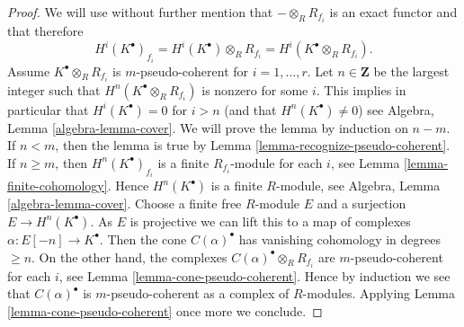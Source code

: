 \documentclass[10pt,a4paper]{amsart}
\theoremstyle{plain}
\theoremstyle{definition}
\theoremstyle{remark}
\numberwithin{equation}{subsection}
\begin{document}
\begin{proof}
We will use without further mention that $- \otimes_R R_{f_i}$ is
an exact functor and that therefore
$$
H^i(K^\bullet)_{f_i} =
H^i(K^\bullet) \otimes_R R_{f_i} = H^i(K^\bullet \otimes_R R_{f_i}).
$$
Assume $K^\bullet \otimes_R R_{f_i}$ is $m$-pseudo-coherent
for $i = 1, \ldots, r$. Let $n \in \mathbf{Z}$ be the largest
integer such that $H^n(K^\bullet \otimes_R R_{f_i})$ is nonzero
for some $i$. This implies in particular that $H^i(K^\bullet) = 0$
for $i > n$ (and that $H^n(K^\bullet) \not = 0$) see
Algebra, Lemma \ref{algebra-lemma-cover}.
We will prove the lemma by induction on $n - m$.
If $n < m$, then the lemma is true by
Lemma \ref{lemma-recognize-pseudo-coherent}.
If $n \geq m$, then $H^n(K^\bullet)_{f_i}$ is a finite $R_{f_i}$-module
for each $i$, see
Lemma \ref{lemma-finite-cohomology}.
Hence $H^n(K^\bullet)$ is a finite $R$-module, see
Algebra, Lemma \ref{algebra-lemma-cover}.
Choose a finite free $R$-module $E$ and a surjection $E \to H^n(K^\bullet)$.
As $E$ is projective we can lift this to a map of complexes
$\alpha : E[-n] \to K^\bullet$. Then the cone $C(\alpha)^\bullet$ has
vanishing cohomology in degrees $\geq n$. On the other hand, the
complexes $C(\alpha)^\bullet \otimes_R R_{f_i}$ are $m$-pseudo-coherent
for each $i$, see
Lemma \ref{lemma-cone-pseudo-coherent}.
Hence by induction we see that $C(\alpha)^\bullet$ is $m$-pseudo-coherent
as a complex of $R$-modules. Applying
Lemma \ref{lemma-cone-pseudo-coherent}
once more we conclude.
\end{proof}
\end{document}

